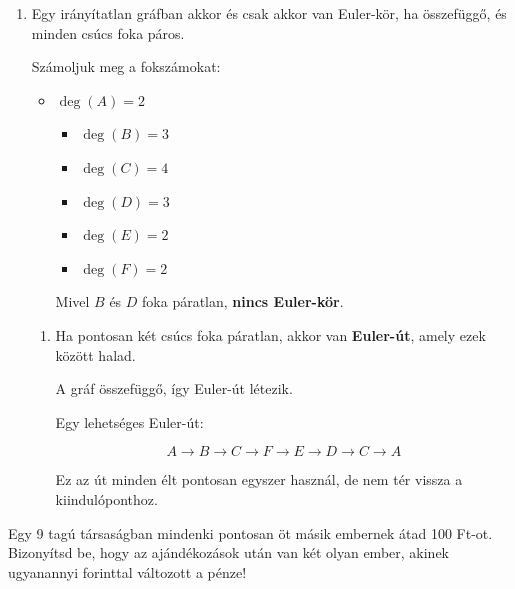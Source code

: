\vspace{1em}

\begin{enumerate}
\item Egy irányítatlan gráfban akkor és csak akkor van Euler-kör, ha összefüggő,
és minden csúcs foka páros.

Számoljuk meg a fokszámokat:
\begin{itemize}
\item $\deg(A)=2$ 
\begin{itemize}
\item $\deg(B)=3$ 
\item $\deg(C)=4$ 
\item $\deg(D)=3$ 
\item $\deg(E)=2$ 
\item $\deg(F)=2$ 
\end{itemize}
Mivel $B$ és $D$ foka páratlan, \textbf{nincs Euler-kör}.
\end{itemize}
\begin{enumerate}
\item Ha pontosan két csúcs foka páratlan, akkor van \textbf{Euler-út},
amely ezek között halad.

A gráf összefüggő, így Euler-út létezik.

Egy lehetséges Euler-út:

\[
A\rightarrow B\rightarrow C\rightarrow F\rightarrow E\rightarrow D\rightarrow C\rightarrow A
\]

Ez az út minden élt pontosan egyszer használ, de nem tér vissza a
kiindulóponthoz. 

\end{enumerate}
\end{enumerate}
\begin{extraproblem}
Egy 9 tagú társaságban mindenki pontosan öt másik embernek átad 100
Ft-ot. Bizonyítsd be, hogy az ajándékozások után van két olyan ember,
akinek ugyanannyi forinttal változott a pénze! 
\end{extraproblem}

